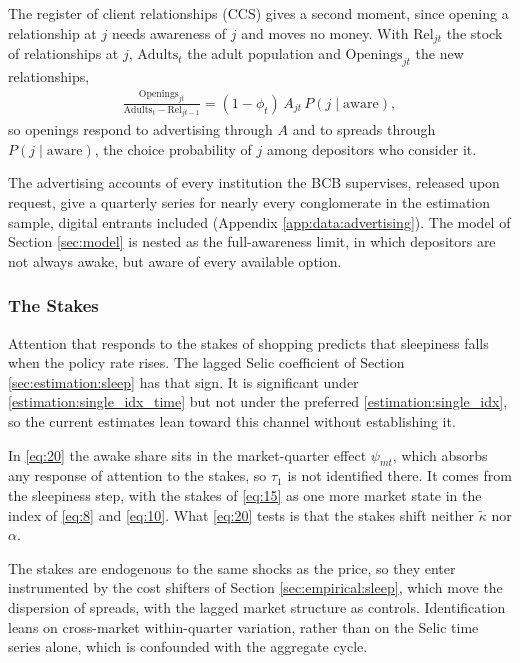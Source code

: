 The register of client relationships (CCS) gives a second moment, since opening a relationship at $j$ needs awareness of $j$ and moves no money. With $\mathrm{Rel}_{jt}$ the stock of relationships at $j$, $\mathrm{Adults}_t$ the adult population and $\mathrm{Openings}_{jt}$ the new relationships,
\begin{gather}
	\frac{\mathrm{Openings}_{jt}}{\mathrm{Adults}_t-\mathrm{Rel}_{jt-1}}=(1-\phi_t)\,A_{jt}\,P(j\mid\text{aware}), \label{eq:22}
\end{gather}
so openings respond to advertising through $A$ and to spreads through $P(j\mid\text{aware})$, the choice probability of $j$ among depositors who consider it.

The advertising accounts of every institution the BCB supervises, released upon request, give a quarterly series for nearly every conglomerate in the estimation sample, digital entrants included (Appendix \ref{app:data:advertising}). The model of Section \ref{sec:model} is nested as the full-awareness limit, in which depositors are not always awake, but aware of every available option.

\subsubsection{The Stakes}\label{sec:disentangle:attention}\label{sec:disentangle:attention:stakes}

Attention that responds to the stakes of shopping predicts that sleepiness falls when the policy rate rises. The lagged Selic coefficient of Section \ref{sec:estimation:sleep} has that sign. It is significant under \ref{estimation:single_idx_time} but not under the preferred \ref{estimation:single_idx}, so the current estimates lean toward this channel without establishing it.

In \eqref{eq:20} the awake share sits in the market-quarter effect $\psi_{mt}$, which absorbs any response of attention to the stakes, so $\tau_1$ is not identified there. It comes from the sleepiness step, with the stakes of \eqref{eq:15} as one more market state in the index of \eqref{eq:8} and \eqref{eq:10}. What \eqref{eq:20} tests is that the stakes shift neither $\tilde{\kappa}$ nor $\alpha$.

The stakes are endogenous to the same shocks as the price, so they enter instrumented by the cost shifters of Section \ref{sec:empirical:sleep}, which move the dispersion of spreads, with the lagged market structure as controls. Identification leans on cross-market within-quarter variation, rather than on the Selic time series alone, which is confounded with the aggregate cycle.

